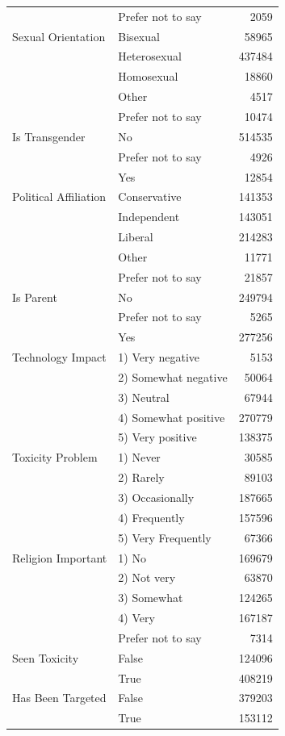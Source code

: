 \begin{longtable}[t]{llr}
 & Prefer not to say & 2059 \\
Sexual Orientation & Bisexual & 58965 \\
 & Heterosexual & 437484 \\
 & Homosexual & 18860 \\
 & Other & 4517 \\
 & Prefer not to say & 10474 \\
Is Transgender & No & 514535 \\
 & Prefer not to say & 4926 \\
 & Yes & 12854 \\
Political Affiliation & Conservative & 141353 \\
 & Independent & 143051 \\
 & Liberal & 214283 \\
 & Other & 11771 \\
 & Prefer not to say & 21857 \\
Is Parent & No & 249794 \\
 & Prefer not to say & 5265 \\
 & Yes & 277256 \\
Technology Impact & 1) Very negative & 5153 \\
 & 2) Somewhat negative & 50064 \\
 & 3) Neutral & 67944 \\
 & 4) Somewhat positive & 270779 \\
 & 5) Very positive & 138375 \\
Toxicity Problem & 1) Never & 30585 \\
 & 2) Rarely & 89103 \\
 & 3) Occasionally & 187665 \\
 & 4) Frequently & 157596 \\
 & 5) Very Frequently & 67366 \\
Religion Important & 1) No & 169679 \\
 & 2) Not very & 63870 \\
 & 3) Somewhat & 124265 \\
 & 4) Very & 167187 \\
 & Prefer not to say & 7314 \\
Seen Toxicity & False & 124096 \\
 & True & 408219 \\
Has Been Targeted & False & 379203 \\
 & True & 153112 \\
\end{longtable}
